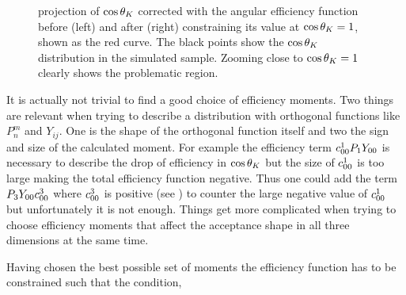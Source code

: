 \begin{figure}[t]
  \centering
  \begin{subfigure}{0.5\textwidth}
    \raggedright
    \scalebox{1.15}{}
    \caption{}
    \label{angAcc_nom}
  \end{subfigure}%
  \hfill%
  \begin{subfigure}{0.5\textwidth}
    \raggedleft
    \scalebox{1.15}{}
    \caption{}
    \label{angAcc_constr_fit}
  \end{subfigure}
  \caption{\pdf projection of $\cos\theta_{K}$ corrected with the angular efficiency function before (left) and after (right)
           constraining its value at $\cos\theta_{K}=1$, shown as the red curve. The black points show the $\cos\theta_{K}$
           distribution in the simulated sample. Zooming close to $\cos\theta_{K}=1$ clearly shows the problematic region.}
  \label{angAcc_constr}
\end{figure}

It is actually not trivial to find a good choice of efficiency moments. Two things are relevant when trying to describe a
distribution with orthogonal functions like $P_n^m$ and $Y_{ij}$. One is the shape of the orthogonal function itself and two the sign and size of the calculated moment.
For example the efficiency term $c^{1}_{00} P_1Y_{00}$ is necessary to describe the drop of efficiency in $\cos\theta_{K}$ but the size of $c^{1}_{00}$
is too large making the total efficiency function negative. Thus one could add the term $P_3Y_{00}c^{3}_{00}$ where $c^{3}_{00}$ is positive
(see  ) to counter the large negative value of $c^{1}_{00}$ but unfortunately it is not enough.
Things get more complicated when trying to choose efficiency moments that affect the acceptance shape in all three dimensions at the same time.

Having chosen the best possible set of moments the efficiency function has to be constrained such that the condition,

